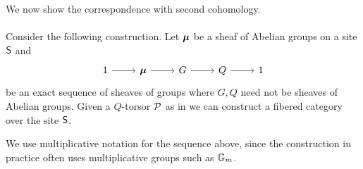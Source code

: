 We now show the correspondence with second cohomology. 
\\\\
Consider the following construction. Let $\bm{\mu}$ be a sheaf of Abelian groups on a site $\mathsf{S}$ and 
$$%
\begin{tikzcd}
	1 & \Bmu & G & Q & 1
	\arrow[from=1-1, to=1-2]
	\arrow[from=1-2, to=1-3]
	\arrow[from=1-3, to=1-4]
	\arrow[from=1-4, to=1-5]
\end{tikzcd}$$
be an exact sequence of sheaves of groups where $G,Q$ need not be sheaves of Abelian groups. Given a $Q$-torsor $\mathcal{P}$ as in  we can construct a fibered category over the site $\mathsf{S}$. 
\begin{remark}
    We use multiplicative notation for the sequence above, since the construction in practice often uses multiplicative groups such as $\mathbb{G}_{m}$. 
\end{remark}
